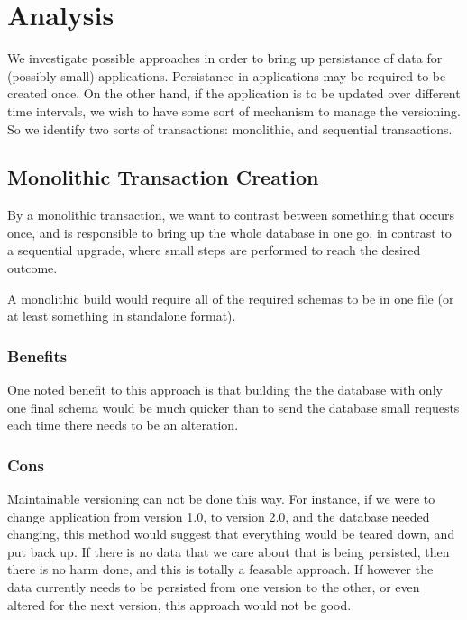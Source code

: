 \section{Analysis}

We investigate possible approaches in order to bring up persistance of data for
(possibly small) applications. Persistance in applications may be required to 
be created once. On the other hand, if the application is to be updated over
different time intervals, we wish to have some sort of mechanism to manage the
versioning. So we identify two sorts of transactions: monolithic, and
sequential transactions.

\subsection{Monolithic Transaction Creation}

By a monolithic transaction, we want to contrast between something that occurs
once, and is responsible to bring up the whole database in one go, in contrast
to a sequential upgrade, where small steps are performed to reach the desired
outcome.

A monolithic build would require all of the required schemas to be in one file
(or at least something in standalone format).

\subsubsection{Benefits}

One noted benefit to this approach is that building the the database with only
one final schema would be much quicker than to send the database small requests
each time there needs to be an alteration.

\subsubsection{Cons}

Maintainable versioning can not be done this way. For instance, if we were to 
change application from version 1.0, to version 2.0, and the database needed
changing, this method would suggest that everything would be teared down, and
put back up. If there is no data that we care about that is being persisted,
then there is no harm done, and this is totally a feasable approach. If however
the data currently needs to be persisted from one version to the other, or even
altered for the next version, this approach would not be good.

